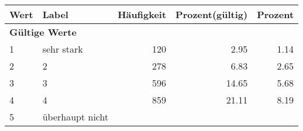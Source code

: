      \begin{longtable}{lXrrr}
     \toprule
     \textbf{Wert} & \textbf{Label} & \textbf{Häufigkeit} & \textbf{Prozent(gültig)} & \textbf{Prozent} \\
     \endhead
     \midrule
     \multicolumn{5}{l}{\textbf{Gültige Werte}}\\

     1 &
     \multicolumn{1}{X}{ sehr stark   } &


       \num{120} &
       \num[round-mode=places,round-precision=2]{2,95} &
         \num[round-mode=places,round-precision=2]{1,14} \\

     2 &
     \multicolumn{1}{X}{ 2   } &


       \num{278} &
       \num[round-mode=places,round-precision=2]{6,83} &
         \num[round-mode=places,round-precision=2]{2,65} \\

     3 &
     \multicolumn{1}{X}{ 3   } &


       \num{596} &
       \num[round-mode=places,round-precision=2]{14,65} &
         \num[round-mode=places,round-precision=2]{5,68} \\

     4 &
     \multicolumn{1}{X}{ 4   } &


       \num{859} &
       \num[round-mode=places,round-precision=2]{21,11} &
         \num[round-mode=places,round-precision=2]{8,19} \\

     5 &
     \multicolumn{1}{X}{ überhaupt nicht   } &



\end{longtable}

